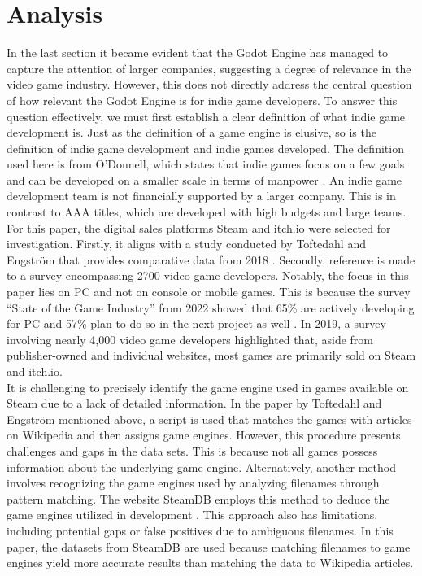 \section{Analysis}
In the last section it became evident that the Godot Engine has managed to capture the attention of larger companies, suggesting a degree of relevance in the video game industry.
However, this does not directly address the central question of how relevant the Godot Engine is for indie game developers.
To answer this question effectively, we must first establish a clear definition of what indie game development is.
Just as the definition of a game engine is elusive, so is the definition of indie game development and indie games developed.
The definition used here is from O'Donnell, which states that indie games focus on a few goals and can be developed on a smaller scale in terms of manpower \cite{indie-definition}.
An indie game development team is not financially supported by a larger company.
This is in contrast to AAA titles, which are developed with high budgets and large teams.\\

For this paper, the digital sales platforms Steam and itch.io were selected for investigation.
Firstly, it aligns with a study conducted by Toftedahl and Engström that provides comparative data from 2018 \cite{game-engine-taxonomy}.
Secondly, reference is made to a survey encompassing 2700 video game developers.
Notably, the focus in this paper lies on PC and not on console or mobile games.
This is because the survey ``State of the Game Industry'' from 2022 showed that 65\% are actively developing for PC and 57\% plan to do so in the next project as well \cite{gdc-2023}.
In 2019, a survey involving nearly 4,000 video game developers highlighted that, aside from publisher-owned and individual websites, most games are primarily sold on Steam and itch.io. \cite{gdc-2019}\\

It is challenging to precisely identify the game engine used in games available on Steam due to a lack of detailed information.
In the paper by Toftedahl and Engström mentioned above, a script is used that matches the games with articles on Wikipedia and then assigns game engines.
However, this procedure presents challenges and gaps in the data sets.
This is because not all games possess information about the underlying game engine.
Alternatively, another method involves recognizing the game engines used by analyzing filenames through pattern matching.
The website SteamDB employs this method to deduce the game engines utilized in development \cite{steamdb-tech}.
This approach also has limitations, including potential gaps or false positives due to ambiguous filenames.
In this paper, the datasets from SteamDB are used because matching filenames to game engines yield more accurate results than matching the data to Wikipedia articles.\\

